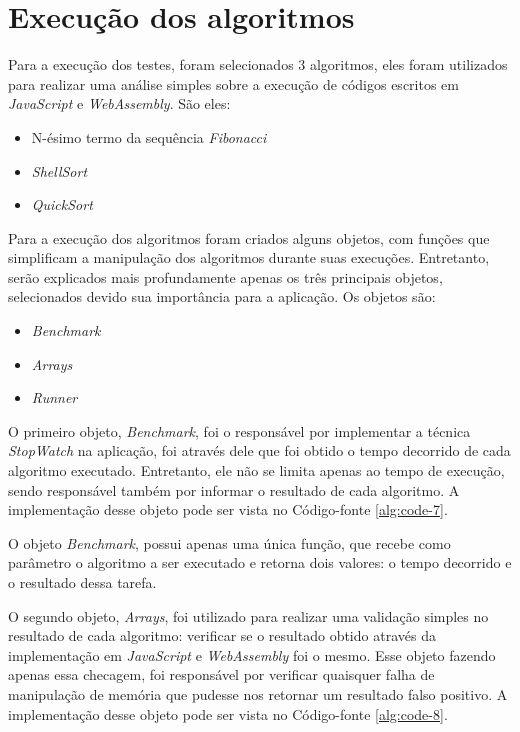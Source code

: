 \section{Execução dos algoritmos}
\label{ssec:algorithms-execution}

Para a execução dos testes, foram selecionados 3 algoritmos, eles foram utilizados para
realizar uma análise simples sobre a execução de códigos escritos em \textit{JavaScript} e
\textit{WebAssembly}. São eles:

\begin{itemize}
    \item N-ésimo termo da sequência \textit{Fibonacci}
    \item \textit{ShellSort}
    \item \textit{QuickSort}
\end{itemize}

Para a execução dos algoritmos foram criados alguns objetos, com funções que simplificam
a manipulação dos algoritmos durante suas execuções. Entretanto, serão explicados mais
profundamente apenas os três principais objetos, selecionados devido sua importância
para a aplicação. Os objetos são:

\begin{itemize}
    \item \textit{Benchmark}
    \item \textit{Arrays}
    \item \textit{Runner}
\end{itemize}

O primeiro objeto, \textit{Benchmark}, foi o responsável por implementar a técnica
\textit{StopWatch} na aplicação, foi através dele que foi obtido o tempo decorrido de cada
algoritmo executado. Entretanto, ele não se limita apenas ao tempo de execução, sendo
responsável também por informar o resultado de cada algoritmo. A implementação desse
objeto pode ser vista no Código-fonte \ref{alg:code-7}.



O objeto \textit{Benchmark}, possui apenas uma única função, que recebe como parâmetro
o algoritmo a ser executado e retorna dois valores: o tempo decorrido e o resultado dessa
tarefa.

O segundo objeto, \textit{Arrays}, foi utilizado para realizar uma validação simples no
resultado de cada algoritmo: verificar se o resultado obtido através da implementação
em \textit{JavaScript} e \textit{WebAssembly} foi o mesmo. Esse objeto fazendo apenas
essa checagem, foi responsável por verificar quaisquer falha de manipulação de memória
que pudesse nos retornar um resultado falso positivo. A implementação desse objeto pode
ser vista no Código-fonte \ref{alg:code-8}.

